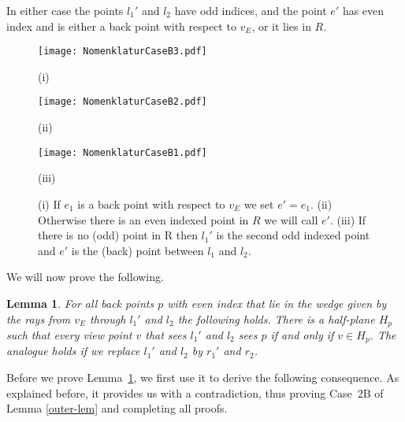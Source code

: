 \documentclass[11pt]{article}
\newtheorem{lemma}{Lemma}
\begin{document}
In either case the points $l_1'$ and $l_2$ have odd indices, and the point $e'$ has even index and is either 
a back point with respect to $v_E$, or it lies in $R$.


\begin{figure}[hbtp]\begin{minipage}[t]{0.26\textwidth}
\begin{center}\texttt{[image: NomenklaturCaseB3.pdf]}

(i)
\end{center}\end{minipage}
\hfill
\begin{minipage}[t]{0.37\textwidth}
\begin{center}\texttt{[image: NomenklaturCaseB2.pdf]}

(ii)
\end{center}\end{minipage}
\hfill
\begin{minipage}[t]{0.28\textwidth}
\begin{center}\texttt{[image: NomenklaturCaseB1.pdf]}

(iii)
\end{center}\end{minipage}
\caption{(i) If $e_1$ is a back point with respect to $v_E$ we set $e'=e_1$. 
(ii) Otherwise there is an even indexed point in $R$ we will
call $e'$.
(iii) If there is no (odd) point in R then $l_1'$ is the second odd indexed point and $e'$ is the (back) point between $l_1$ and $l_2$.}
\label{NomenklaturCaseB-fig}
\end{figure}


We will now prove the following.

\begin{lemma} \label{existenceHalfplanes-lem}
For all back points $p$ with even index that lie in the wedge given by the rays from $v_E$ through $l_1'$ and $l_2$ the following holds.
There is a half-plane $H_p$ such that every view point $v$ that sees $l_1'$ and $l_2$ sees $p$ if and only if $v\in H_p$.
The analogue holds if we replace $l_1'$ and $l_2$ by $r_1'$ and $r_2$.
\end{lemma}
 
 Before we prove Lemma~\ref{existenceHalfplanes-lem}, we first use it to derive the following consequence. As explained before, it 
 provides us with a contradiction, thus proving Case~2B of Lemma \ref{outer-lem} and completing all proofs.
 
\end{document}
